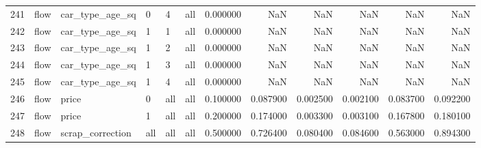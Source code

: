 \begin{tabular}{llllllrrrrrr}
241 & flow & car_type_age_sq & 0 & 4 & all & 0.000000 & NaN & NaN & NaN & NaN & NaN \\
242 & flow & car_type_age_sq & 1 & 1 & all & 0.000000 & NaN & NaN & NaN & NaN & NaN \\
243 & flow & car_type_age_sq & 1 & 2 & all & 0.000000 & NaN & NaN & NaN & NaN & NaN \\
244 & flow & car_type_age_sq & 1 & 3 & all & 0.000000 & NaN & NaN & NaN & NaN & NaN \\
245 & flow & car_type_age_sq & 1 & 4 & all & 0.000000 & NaN & NaN & NaN & NaN & NaN \\
246 & flow & price & 0 & all & all & 0.100000 & 0.087900 & 0.002500 & 0.002100 & 0.083700 & 0.092200 \\
247 & flow & price & 1 & all & all & 0.200000 & 0.174000 & 0.003300 & 0.003100 & 0.167800 & 0.180100 \\
248 & flow & scrap_correction & all & all & all & 0.500000 & 0.726400 & 0.080400 & 0.084600 & 0.563000 & 0.894300 \\
\bottomrule
\end{tabular}
